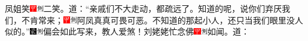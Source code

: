 凤姐笑{\includegraphics[width=3mm]{../Images/00002}\includegraphics[width=3mm]{../Images/00011}\footnotesize \kaishu 二笑。}道：“亲戚们不大走动，都疏远了。知道的呢，说你们弃厌我们，不肯常来；{\includegraphics[width=3mm]{../Images/00002}\includegraphics[width=3mm]{../Images/00011}\footnotesize \kaishu 阿凤真真可畏可恶。}不知道的那起小人，还只当我们眼里没人似的。”{\includegraphics[width=3mm]{../Images/00006}\includegraphics[width=3mm]{../Images/00011}\footnotesize \kaishu 偏会如此写来，教人爱煞！}刘姥姥忙念佛{\includegraphics[width=3mm]{../Images/00002}\includegraphics[width=3mm]{../Images/00011}\footnotesize \kaishu 如闻。}道：